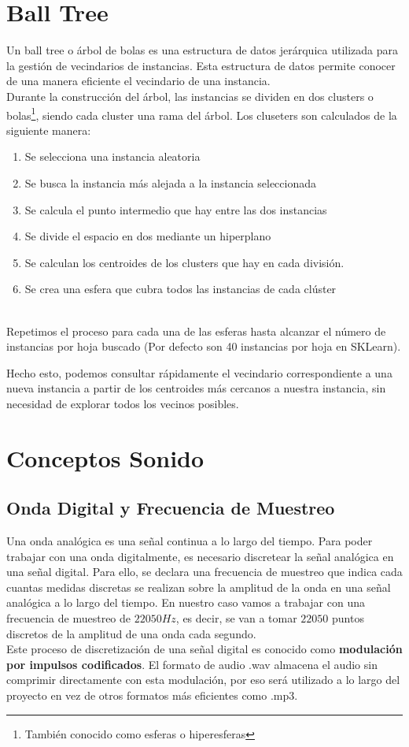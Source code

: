 \section{Ball Tree}\label{ball_tree}
Un ball tree o árbol de bolas es una estructura de datos jerárquica utilizada para la gestión de vecindarios de instancias. Esta estructura de datos permite conocer de una manera eficiente el vecindario de una instancia.\\
Durante la construcción del árbol, las instancias se dividen en dos clusters o bolas\footnote{También conocido como esferas o hiperesferas}, siendo cada cluster una rama del árbol. Los cluseters son calculados de la siguiente manera:
\begin{enumerate}
    \item Se selecciona una instancia aleatoria
    \item Se busca la instancia más alejada a la instancia seleccionada
    \item Se calcula el punto intermedio que hay entre las dos instancias
    \item Se divide el espacio en dos mediante un hiperplano
    \item Se calculan los centroides de los clusters que hay en cada división.
    \item Se crea una esfera que cubra todos las instancias de cada clúster
\end{enumerate}\\
Repetimos el proceso para cada una de las esferas hasta alcanzar el número de instancias por hoja buscado (Por defecto son 40 instancias por hoja en SKLearn).

Hecho esto, podemos consultar rápidamente el vecindario correspondiente a una nueva instancia a partir de los centroides más cercanos a nuestra instancia, sin necesidad de explorar todos los vecinos posibles. 



\section{Conceptos Sonido}
\subsection{Onda Digital y Frecuencia de Muestreo}
Una onda analógica es una señal continua a lo largo del tiempo. Para poder trabajar con una onda digitalmente, es necesario discretear la señal analógica en una señal digital.
Para ello, se declara una frecuencia de muestreo que indica cada cuantas medidas discretas se realizan sobre la amplitud de la onda en una señal analógica a lo largo del tiempo. En nuestro caso vamos a trabajar con una frecuencia de muestreo de $22050 Hz$, es decir, se van a tomar $22050$ puntos discretos de la amplitud de una onda cada segundo.\\
Este proceso de discretización de una señal digital es conocido como \textbf{modulación por impulsos codificados}. El formato de audio .wav almacena el audio sin comprimir directamente con esta modulación, por eso será utilizado a lo largo del proyecto en vez de otros formatos más eficientes como .mp3.


